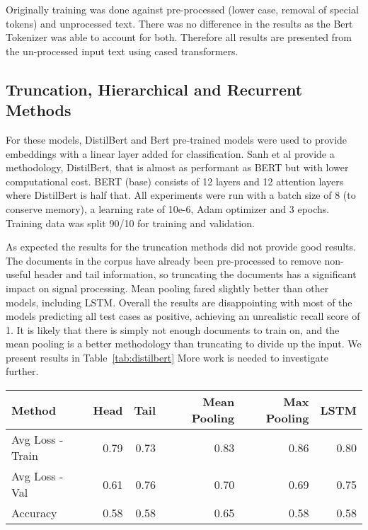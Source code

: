 \documentclass[twocolumn,10pt]{wmrDoc}
\begin{document}
Originally training was done against pre-processed (lower case, removal of special tokens) and unprocessed text. There was no difference in the results as the Bert Tokenizer was able to account for both. Therefore all results are presented from the un-processed input text using cased transformers. 

\subsection{Truncation, Hierarchical and Recurrent Methods }
For these models, DistilBert and Bert pre-trained models were used to provide embeddings with a linear layer added for classification. Sanh et al \cite{sanh} provide a methodology, DistilBert, that is almost as performant as BERT but with lower computational cost. BERT (base) consists of 12 layers and 12 attention layers where DistilBert is half that. All experiments were run with a batch size of 8 (to conserve memory), a learning rate of 10e-6, Adam optimizer and 3 epochs. Training data was split 90/10 for training and validation.

As expected the results for the truncation methods did not provide good results. The documents in the corpus have already been pre-processed to remove non-useful header and tail information, so truncating the documents has a significant impact on signal processing. Mean pooling fared slightly better than other models, including LSTM. Overall the results are disappointing with most of the models predicting all test cases as positive, achieving an unrealistic recall score of 1. It is likely that there is simply not enough documents to train on, and the mean pooling is a better methodology than truncating to divide up the input. We present results in Table~\ref{tab:distilbert} More work is needed to investigate further.

\begin{table*}
 \caption{BERT, DistilBERT Methods}
  \centering
  \begin{tabular}{lrrrrr}
    \toprule
    Method & Head & Tail & Mean Pooling & Max Pooling & LSTM \\
    \midrule
    Avg Loss - Train  & 0.79 & 0.73 & 0.83 & 0.86 & 0.80 \\
    Avg Loss - Val    & 0.61 & 0.76 & 0.70 & 0.69 & 0.75 \\
    Accuracy          & 0.58 & 0.58 & 0.65 & 0.58 & 0.58 \\
    \bottomrule
  \end{tabular}
  \label{tab:distilbert}
\end{table*}
\end{document}
